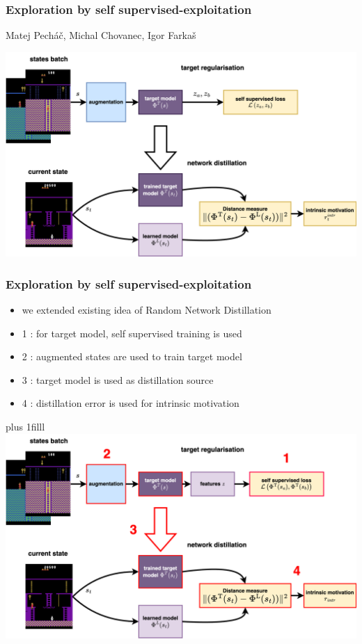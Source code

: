 \documentclass{beamer}
\begin{document}
\begin{frame}
  \frametitle{Exploration by self supervised-exploitation}
  Matej Pecháč, Michal Chovanec, Igor Farkaš

  \centering
  \includegraphics[scale=0.5]{../diagrams/cnd/cnd-cnd.png}

\end{frame}



\begin{frame}
  \frametitle{Exploration by self supervised-exploitation}
  \begin{itemize}
    \item we extended existing idea of Random Network Distillation
    \item {\color{red} 1 : } for target model, self supervised training is used
    \item {\color{red} 2 : } augmented states are used to train target model
    \item {\color{red} 3 : } target model is used as distillation source
    \item {\color{red} 4 : } distillation error is used for intrinsic motivation
  \end{itemize} 

  \vskip 0pt plus 1filll 
    \centering
    \includegraphics[scale=0.4]{../diagrams/cnd/cnd-cnd-4.png}

\end{frame}
\end{document}

